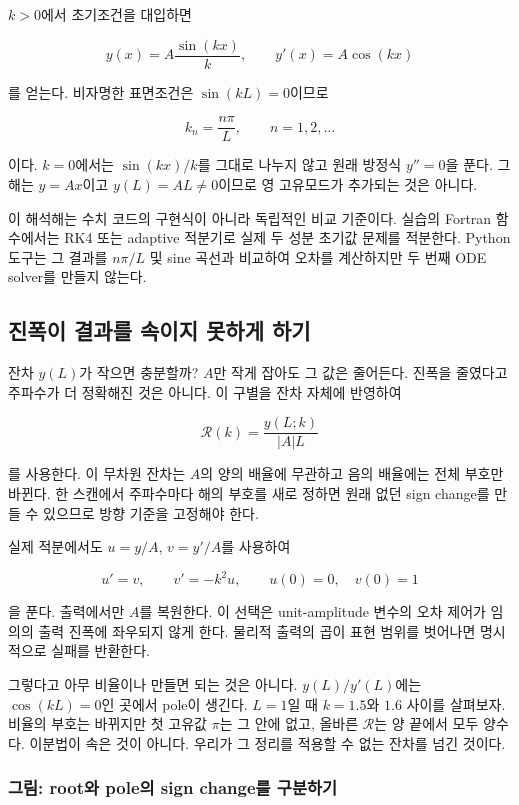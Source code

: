 \documentclass[
  10pt,
  a4paper,
]{article}
\begin{document}
\(k>0\)에서 초기조건을 대입하면

\[
y(x)=A\frac{\sin(kx)}{k},\qquad y'(x)=A\cos(kx)
\]

를 얻는다. 비자명한 표면조건은 \(\sin(kL)=0\)이므로

\[
k_n=\frac{n\pi}{L},\qquad n=1,2,\ldots
\]

이다. \(k=0\)에서는 \(\sin(kx)/k\)를 그대로 나누지 않고 원래 방정식
\(y''=0\)을 푼다. 그 해는 \(y=Ax\)이고 \(y(L)=AL\ne0\)이므로 영
고유모드가 추가되는 것은 아니다.

이 해석해는 수치 코드의 구현식이 아니라 독립적인 비교 기준이다. 실습의
Fortran 함수에서는 RK4 또는 adaptive 적분기로 실제 두 성분 초기값 문제를
적분한다. Python 도구는 그 결과를 \(n\pi/L\) 및 sine 곡선과 비교하여
오차를 계산하지만 두 번째 ODE solver를 만들지 않는다.

\subsection{진폭이 결과를 속이지 못하게
하기}\label{uxc9c4uxd3eduxc774-uxacb0uxacfcuxb97c-uxc18duxc774uxc9c0-uxbabbuxd558uxac8c-uxd558uxae30}

잔차 \(y(L)\)가 작으면 충분할까? \(A\)만 작게 잡아도 그 값은 줄어든다.
진폭을 줄였다고 주파수가 더 정확해진 것은 아니다. 이 구별을 잔차 자체에
반영하여

\[
\mathcal R(k)=\frac{y(L;k)}{|A|L}
\]

를 사용한다. 이 무차원 잔차는 \(A\)의 양의 배율에 무관하고 음의 배율에는
전체 부호만 바뀐다. 한 스캔에서 주파수마다 해의 부호를 새로 정하면 원래
없던 sign change를 만들 수 있으므로 방향 기준을 고정해야 한다.

실제 적분에서도 \(u=y/A\), \(v=y'/A\)를 사용하여

\[
u'=v,\qquad v'=-k^2u,\qquad u(0)=0,\quad v(0)=1
\]

을 푼다. 출력에서만 \(A\)를 복원한다. 이 선택은 unit-amplitude 변수의
오차 제어가 임의의 출력 진폭에 좌우되지 않게 한다. 물리적 출력의 곱이
표현 범위를 벗어나면 명시적으로 실패를 반환한다.

그렇다고 아무 비율이나 만들면 되는 것은 아니다. \(y(L)/y'(L)\)에는
\(\cos(kL)=0\)인 곳에서 pole이 생긴다. \(L=1\)일 때 \(k=1.5\)와 \(1.6\)
사이를 살펴보자. 비율의 부호는 바뀌지만 첫 고유값 \(\pi\)는 그 안에
없고, 올바른 \(\mathcal R\)는 양 끝에서 모두 양수다. 이분법이 속은 것이
아니다. 우리가 그 정리를 적용할 수 없는 잔차를 넘긴 것이다.

\subsubsection{그림: root와 pole의 sign change를
구분하기}\label{uxadf8uxb9bc-rootuxc640-poleuxc758-sign-changeuxb97c-uxad6cuxbd84uxd558uxae30}
\end{document}
